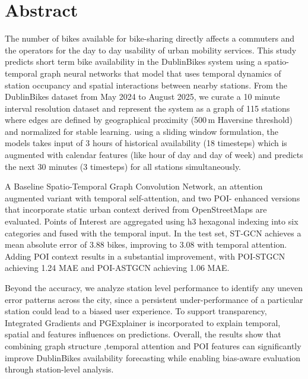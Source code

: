 \documentclass[11pt]{report}
\begin{document}

\chapter*{Abstract}

\thispagestyle{empty}

\indent
The number of bikes available for bike-sharing directly affects a commuters and the operators for the day to day usability of urban mobility services. This study predicts short term bike availability in the DublinBikes system using a spatio-temporal graph neural networks that model that uses  temporal dynamics of station occupancy and spatial interactions between nearby stations. From the  DublinBikes dataset from May 2024 to August 2025, we curate a 10 minute interval resolution dataset and represent the system as a graph of 115 stations where edges are defined by geographical proximity (500\,m Haversine threshold) and normalized for stable learning. using a sliding window formulation, the models takes input of 3 hours of historical availability (18 timesteps) which is augmented with calendar features (like hour of day and day of week) and predicts the next 30 minutes (3 timesteps) for all stations simultaneously. 

 A Baseline Spatio-Temporal Graph Convolution Network, an attention augmented variant with temporal self-attention, and two POI- enhanced versions that incorporate static urban context derived from OpenStreetMaps are evaluated. Points of Interest are aggregated using h3 hexagonal indexing into six  categories and fused with the temporal input. In the test set, ST-GCN achieves a mean absolute error of 3.88 bikes,  improving to 3.08 with temporal attention. Adding POI context results in a substantial improvement, with POI-STGCN achieving 1.24 MAE and POI-ASTGCN achieving 1.06 MAE.

Beyond the accuracy, we analyze station level performance to identify any uneven error patterns across the city, since a persistent under-performance of a particular station could lead to a biased user experience. To support transparency, Integrated Gradients and PGExplainer is incorporated to explain temporal, spatial and features influences on predictions. Overall, the results show that combining graph structure ,temporal attention and POI features can significantly improve DublinBikes availability forecasting while enabling bias-aware evaluation through station-level analysis.
\end{document}
